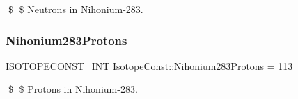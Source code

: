 \$ \$ Neutrons in Nihonium-\/283. \mbox{\label{group___isotope_const-_nihonium-_nh283_gab8a3077e42bb29a1b267cb89b83074bd}} 
\subsubsection{\texorpdfstring{Nihonium283\+Protons}{Nihonium283Protons}}
{\footnotesize\ttfamily \mbox{\hyperlink{group___isotope_const-_macros_ga5f18360b3e99483a35c32d789e62621c}{I\+S\+O\+T\+O\+P\+E\+C\+O\+N\+S\+T\+\_\+\+I\+NT}} Isotope\+Const\+::\+Nihonium283\+Protons = 113}

\$ \$ Protons in Nihonium-\/283. 